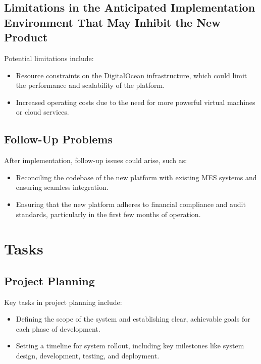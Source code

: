 \documentclass[12pt]{article}
\begin{document}
\subsection{Limitations in the Anticipated Implementation Environment That May Inhibit the New Product}
Potential limitations include:
\begin{itemize}
    \item Resource constraints on the DigitalOcean infrastructure, which could limit the performance and scalability of the platform.
    \item Increased operating costs due to the need for more powerful virtual machines or cloud services.
\end{itemize}

\subsection{Follow-Up Problems}
After implementation, follow-up issues could arise, such as:
\begin{itemize}
    \item Reconciling the codebase of the new platform with existing MES systems and ensuring seamless integration.
    \item Ensuring that the new platform adheres to financial compliance and audit standards, particularly in the first few months of operation.
\end{itemize}

\section{Tasks}
\subsection{Project Planning}
Key tasks in project planning include:
\begin{itemize}
    \item Defining the scope of the system and establishing clear, achievable goals for each phase of development.
    \item Setting a timeline for system rollout, including key milestones like system design, development, testing, and deployment.
\end{itemize}
\end{document}
